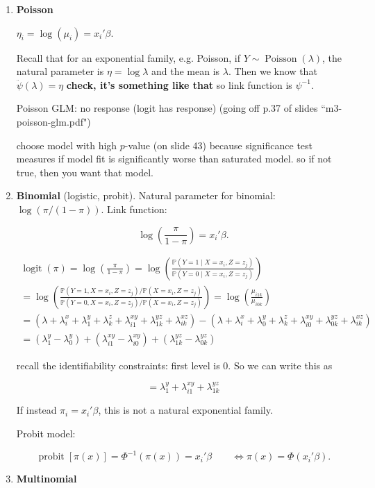 \begin{enumerate}

\item \textbf{Poisson}

\(\eta_i = \log (\mu_i) = x_i'\beta\). 

\begin{remark}

Recall that for an exponential family, e.g. Poisson, if \(Y \sim \operatorname{Poisson}(\lambda)\), the natural parameter is \(\eta = \log \lambda\) and the mean is \(\lambda\). Then we know that \(\ddot{\psi}(\lambda) = \eta\) \textbf{check, it's something like that} so link function is \(\psi^{-1}\).

\end{remark}

Poisson GLM: no response (logit has response) (going off p.37 of slides ``m3-poisson-glm.pdf") 

choose model with high \(p\)-value (on slide 43) because significance test measures if model fit is significantly worse than saturated model. so if not true, then you want that model.

\item \textbf{Binomial} (logistic, probit). Natural parameter for binomial: \(\log(\pi/(1-\pi))\). Link function:

\[
\log \left( \frac{\pi}{1-\pi} \right) = x_i' \beta.
\] 


\begin{multline*}
\operatorname{logit}(\pi) = \log \left( \frac{\pi}{1-\pi} \right) = \log \left( \frac{\mathbb{P}(Y = 1 \mid X = x_i, Z = z_j) }{\mathbb{P}(Y = 0 \mid X = x_i, Z = z_j) } \right)
\\  = \log \left( \frac{\mathbb{P}(Y = 1 , X = x_i, Z = z_j)/ \mathbb{P}(X = x_i, Z = z_j) }{\mathbb{P}(Y = 0, X = x_i, Z = z_j) / \mathbb{P}(X = x_i, Z = z_j) } \right)  =  \log \left( \frac{\mu_{i 1 k}}{\mu_{i0k}} \right) 
\\  = (\lambda + \lambda_i^x + \lambda_1^y + \lambda_k^z + \lambda_{i1}^{xy} + \lambda_{1k}^{yz} + \lambda_{ik}^{xz}) - 
(\lambda + \lambda_i^x + \lambda_0^y + \lambda_k^z + \lambda_{i0}^{xy} + \lambda_{0k}^{yz} + \lambda_{ik}^{xz}) 
\\ = (\lambda_1^y - \lambda_0^y) + (\lambda_{i1}^{xy} - \lambda_{i0}^{xy}) + (\lambda_{1k}^{yz} - \lambda_{0k}^{yz}) 
\end{multline*}

recall the identifiability constraints: first level is 0. So we can write this as 

\[
=   \lambda_1^y +  \lambda_{i1}^{xy} + \lambda_{1k}^{yz}
\]



If instead \(\pi_i = x_i'\beta\), this is not a natural exponential family. 

Probit model: 

\[
\operatorname{probit}[\pi(x)] = \Phi^{-1}(\pi(x)) = x_i' \beta \qquad \iff \pi(x) = \Phi(x_i'\beta).
\]

\item \textbf{Multinomial}

\end{enumerate}

